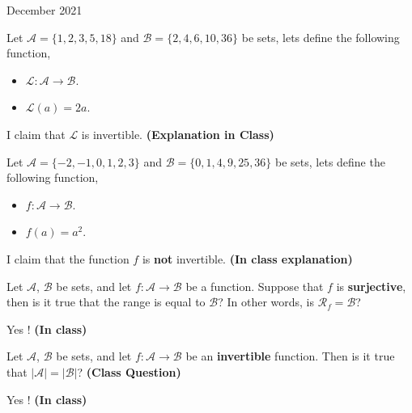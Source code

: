\documentclass[12pt,oneside]{book} %
\begin{document}
\begin{lec}{December 2021}
\begin{ex}
  Let $ \mathcal{A} = \{1,2,3,5,18\} $ and $ \mathcal{B} = \{2,4,6,10,36\} $ be sets, lets define the
  following function, 
  \begin{itemize}
    \item $\mathcal{L} \colon \mathcal{A} \to \mathcal{B}$.
    \item $\mathcal{L}(a) = 2a$.
  \end{itemize}
  I claim that $\mathcal{L}$ is invertible. \textbf{(Explanation in Class)}
\end{ex}

\begin{ex}
  Let $ \mathcal{A} = \{-2,-1,0,1,2,3\} $ and $ \mathcal{B} = \{0,1,4,9,25,36\} $ be sets, lets define the
  following function, 
  \begin{itemize}
    \item $f \colon \mathcal{A} \to \mathcal{B}$.
    \item $f(a) = a^2$.
  \end{itemize}
  I claim that the function $f$ is \textbf{not} invertible. \textbf{(In class explanation)}
\end{ex}

\begin{question}
  Let $\mathcal{A}$, $\mathcal{B}$ be sets, and let $f \colon  \mathcal{A} \to \mathcal{B}$ be a function. Suppose that $f$ is
  \textbf{surjective}, then is it true that the range is equal to $\mathcal{B}$? In other words, is $\mathcal{R}_f = \mathcal{B}$?
\end{question}

\begin{answer}
  Yes ! \textbf{(In class)}
\end{answer}


\begin{question}
  Let $\mathcal{A}$, $\mathcal{B}$ be sets, and let $f \colon  \mathcal{A} \to \mathcal{B}$ be an \textbf{invertible} function.
  Then is it true that $ \left|\mathcal{A}\right| = \left|\mathcal{B}\right|$? \textbf{(Class Question)}
\end{question}

\begin{answer}
  Yes ! \textbf{(In class)}
\end{answer}























	\end{lec}
\end{document}
